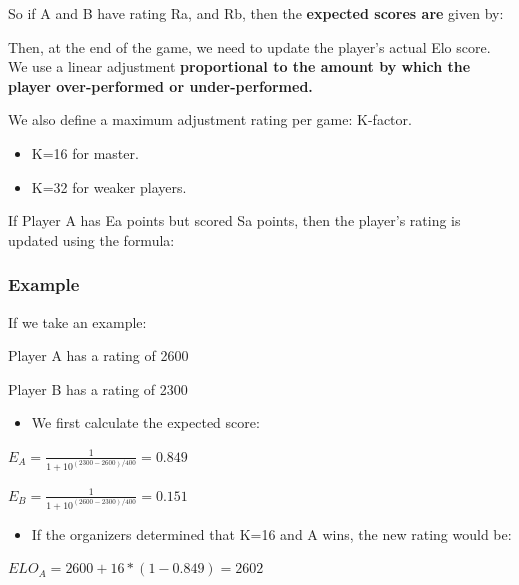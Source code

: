 \documentclass[11pt,a4paper]{article}
\begin{document}
So if A and B have rating Ra, and Rb, then the \textbf{expected scores are} given by:


Then, at the end of the game, we need to update the player's actual Elo score. We use a linear adjustment \textbf{proportional to the amount by which the player over-performed or under-performed.}

We also define a maximum adjustment rating per game: K-factor.

\begin{itemize}
\tightlist
\item
  K=16 for master.
\item
  K=32 for weaker players.
\end{itemize}

If Player A has Ea points but scored Sa points, then the player's rating is updated using the formula:


\subsubsection{Example}\label{example}

If we take an example:

Player A has a rating of 2600

Player B has a rating of 2300

\begin{itemize}
\tightlist
\item
  We first calculate the expected score:
\end{itemize}

\(E_{A} = \frac{1}{1+10^{(2300-2600)/400}} = 0.849\)

\(E_{B} = \frac{1}{1+10^{(2600-2300)/400}} = 0.151\)

\begin{itemize}
\tightlist
\item
  If the organizers determined that K=16 and A wins, the new rating would be:
\end{itemize}

\(ELO_A = 2600 + 16*(1-0.849) = 2602\)
\end{document}
